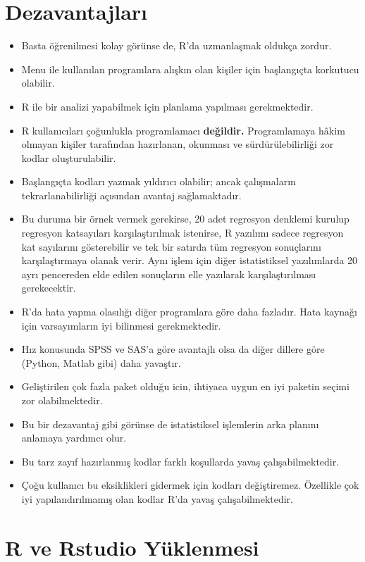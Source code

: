 \documentclass[
  oneside]{book}
\begin{document}
\hypertarget{dezavantajlarux131}{%
\section{Dezavantajları}\label{dezavantajlarux131}}

\begin{itemize}
\item
  Basta öğrenilmesi kolay görünse de, R'da uzmanlaşmak oldukça zordur.
\item
  Menu ile kullanılan programlara alışkın olan kişiler için başlangıçta korkutucu olabilir.
\item
  R ile bir analizi yapabilmek için planlama yapılması gerekmektedir.
\item
  R kullanıcıları çoğunlukla programlamacı \textbf{değildir.} Programlamaya hâkim olmayan kişiler tarafından hazırlanan, okunması ve sürdürülebilirliği zor kodlar oluşturulabilir.
\item
  Başlangıçta kodları yazmak yıldırıcı olabilir; ancak çalışmaların tekrarlanabilirliği açısından avantaj sağlamaktadır.
\item
  Bu duruma bir örnek vermek gerekirse, 20 adet regresyon denklemi kurulup regresyon katsayıları karşılaştırılmak istenirse, R yazılımı sadece regresyon kat sayılarını gösterebilir ve tek bir satırda tüm regresyon sonuçlarını karşılaştırmaya olanak verir. Aynı işlem için diğer istatistiksel yazılımlarda 20 ayrı pencereden elde edilen sonuçların elle yazılarak karşılaştırılması gerekecektir.
\item
  R'da hata yapma olasılığı diğer programlara göre daha fazladır. Hata kaynağı için varsayımların iyi bilinmesi gerekmektedir.
\item
  Hız konusunda SPSS ve SAS'a göre avantajlı olsa da diğer dillere göre (Python, Matlab gibi) daha yavaştır.
\item
  Geliştirilen çok fazla paket olduğu icin, ihtiyaca uygun en iyi paketin seçimi zor olabilmektedir.
\item
  Bu bir dezavantaj gibi görünse de istatistiksel işlemlerin arka planını anlamaya yardımcı olur.
\item
  Bu tarz zayıf hazırlanmış kodlar farklı koşullarda yavaş çalışabilmektedir.
\item
  Çoğu kullanıcı bu eksiklikleri gidermek için kodları değiştiremez. Özellikle çok iyi yapılandırılmamış olan kodlar R'da yavaş çalışabilmektedir.
\end{itemize}

\hypertarget{r-ve-rstudio-yuxfcklenmesi}{%
\section{R ve Rstudio Yüklenmesi}\label{r-ve-rstudio-yuxfcklenmesi}}
\end{document}
